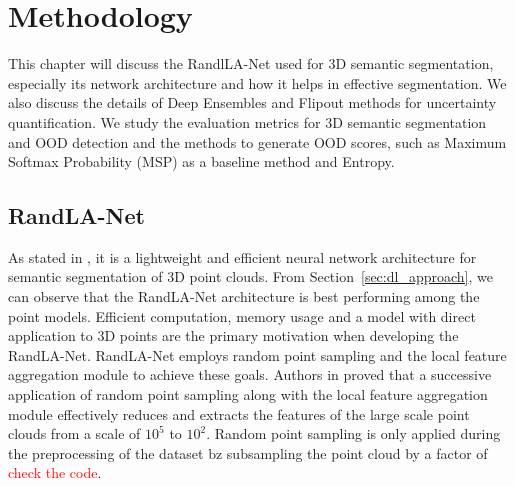 
\chapter{Methodology}
\label{chapter:methodology}
This chapter will discuss the RandlLA-Net used for 3D semantic segmentation, especially its network architecture and how it helps in effective segmentation. 
We also discuss the details of Deep Ensembles and Flipout methods for uncertainty quantification.
We study the evaluation metrics for 3D semantic segmentation and OOD detection and the methods to generate OOD scores, such as Maximum Softmax Probability (MSP) as a baseline method and Entropy.
\section{RandLA-Net}
\label{sec:meth_randla}
As stated in \cite{Hu_2020_CVPR_Randla}, it is a lightweight and efficient neural network architecture for semantic segmentation of 3D point clouds.
From Section~\ref{sec:dl_approach}, we can observe that the RandLA-Net architecture is best performing among the point models.
Efficient computation, memory usage and a model with direct application to 3D points are the primary motivation when developing the RandLA-Net.
RandLA-Net employs random point sampling and the local feature aggregation module to achieve these goals.
Authors in \cite{Hu_2020_CVPR_Randla} proved that a successive application of random point sampling along with the local feature aggregation module effectively reduces and extracts the features of the large scale point clouds from a scale of $10^5$ to $10^2$.
Random point sampling is only applied during the preprocessing of the dataset bz subsampling the point cloud by a factor of \textcolor{red}{check the code}.

